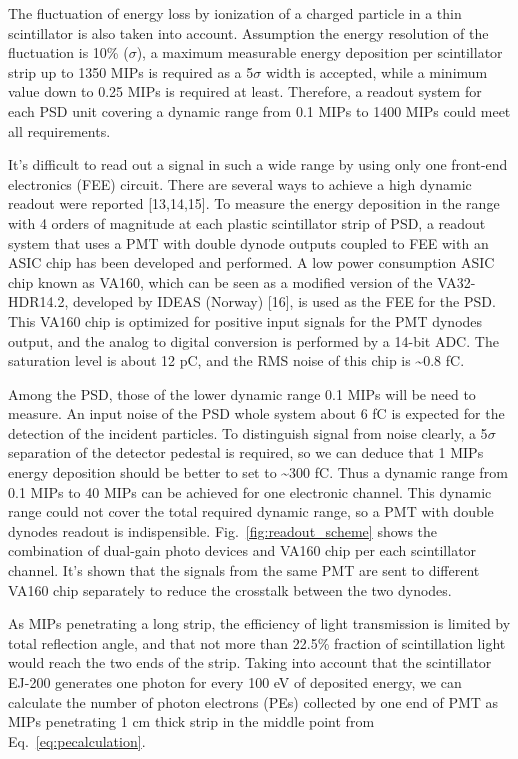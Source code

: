 \documentclass[5p, times]{elsarticle}
\begin{document}
The fluctuation of energy loss by ionization of a charged particle in a thin scintillator is also taken into account.
Assumption the energy resolution of the fluctuation is 10\% ($\sigma $), a maximum measurable energy deposition per
scintillator strip up to 1350 MIPs is required as a 5$\sigma $ width is accepted, while a minimum value down to 0.25
MIPs is required at least. Therefore, a readout system for each PSD unit covering a dynamic range from 0.1 MIPs to 1400
MIPs could meet all requirements.

It’s difficult to read out a signal in such a wide range by using only one front-end electronics (FEE) circuit. There
are several ways to achieve a high dynamic readout were reported [13,14,15]. To measure the energy deposition in the
range with 4 orders of magnitude at each plastic scintillator strip of PSD, a readout system that uses a PMT with
double dynode outputs coupled to FEE with an ASIC chip has been developed and performed. A low power consumption ASIC
chip known as VA160, which can be seen as a modified version of the VA32-HDR14.2, developed by IDEAS (Norway) [16], is
used as the FEE for the PSD. This VA160 chip is optimized for positive input signals for the PMT dynodes output, and
the analog to digital conversion is performed by a 14-bit ADC. The saturation level is about 12 pC, and the RMS noise
of this chip is \~{}0.8 fC.

Among the PSD, those of the lower dynamic range 0.1 MIPs will be need to measure. An input noise of the PSD whole system
about 6 fC is expected for the detection of the incident particles. To distinguish signal from noise clearly, a
5$\sigma $ separation of the detector pedestal is required, so we can deduce that 1 MIPs energy deposition should be
better to set to \~{}300 fC. Thus a dynamic range from 0.1 MIPs to 40 MIPs can be achieved for one electronic channel.
This dynamic range could not cover the total required dynamic range, so a PMT with double dynodes readout is
indispensible. Fig.~\ref{fig:readout_scheme} shows the combination of dual-gain photo devices and VA160 chip per each scintillator channel.
It’s shown that the signals from the same PMT are sent to different VA160 chip separately to reduce the crosstalk
between the two dynodes.

As MIPs penetrating a long strip, the efficiency of light transmission is limited by total reflection angle, and that
not more than 22.5\% fraction of scintillation light would reach the two ends of the strip. Taking into account that
the scintillator EJ-200 generates one photon for every 100 eV of deposited energy, we can calculate the number of
photon electrons (PEs) collected by one end of PMT as MIPs penetrating 1 cm thick strip in the middle point from
Eq.~\ref{eq:pecalculation}.
\end{document}
